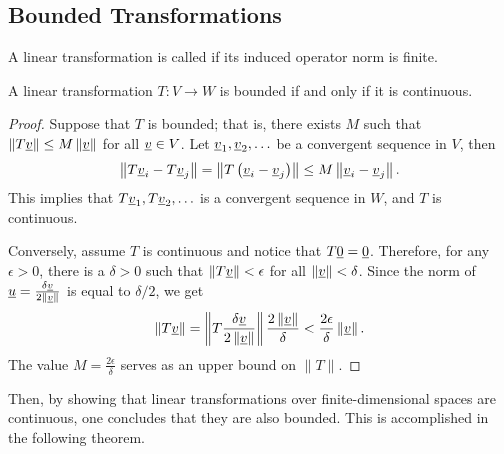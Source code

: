 \subsection{Bounded Transformations}

\begin{definition}
A linear transformation is called  if its induced operator norm is finite.
\end{definition}

\begin{theorem}
A linear transformation $T \colon V \rightarrow W$ is bounded if and only if it is continuous.
\end{theorem}
\begin{proof}
Suppose that $T$ is bounded; that is, there exists $M$ such that  $\left\| T \underline{v} \right\| \leq M \left\| \underline{v} \right\|$ for all $\underline{v} \in V$.
Let $\underline{v}_1, \underline{v}_2, \ldots$ be a convergent sequence in $V$, then
\begin{equation*}
\left\| T \underline{v}_i - T \underline{v}_j \right\|
= \left\| T \left( \underline{v}_i - \underline{v}_j \right) \right\|
\leq  M \left\| \underline{v}_i - \underline{v}_j \right\| .
\end{equation*}
This implies that $T \underline{v}_1, T \underline{v}_2, \ldots$ is a convergent sequence in $W$, and $T$ is continuous.

Conversely, assume $T$ is continuous and notice that $T \underline{0} = \underline{0}$.
Therefore, for any $\epsilon > 0$, there is a $\delta>0$ such that $\| T \underline{v} \| < \epsilon$ for all $\| \underline{v} \| < \delta$.
Since the norm of $\underline{u} = \frac{ \delta \underline{v} }{2 \left\| \underline{v} \right\| }$ is equal to $\delta/2$, we get
\begin{equation*}
\left\| T \underline{v} \right\|
= \left\| T \frac{ \delta \underline{v} }{2 \left\| \underline{v} \right\| } \right\|
\frac{ 2 \left\| \underline{v} \right\| }{ \delta }
< \frac{2 \epsilon}{ \delta } \left\| \underline{v} \right\|.
\end{equation*}
The value $M = \frac{2 \epsilon}{\delta}$ serves as an upper bound on $\|T\|$.
\end{proof}

Then, by showing that linear transformations over finite-dimensional spaces are continuous, one concludes that they are also bounded.
This is accomplished in the following theorem.

